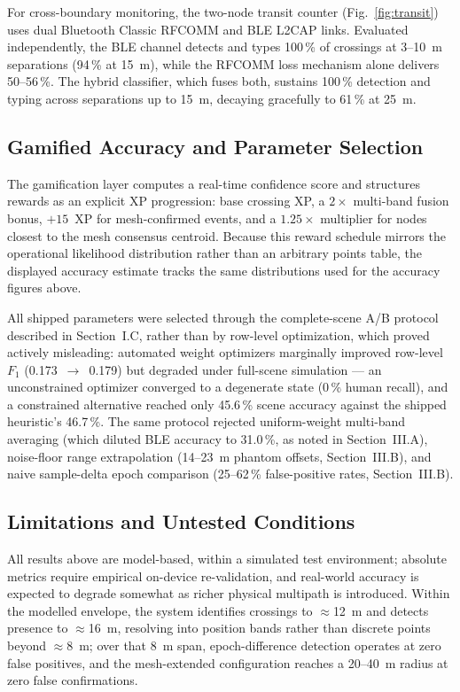 \documentclass[journal,10pt]{IEEEtran}
\begin{document}
For cross-boundary monitoring, the two-node transit counter (Fig.~\ref{fig:transit})
uses dual Bluetooth Classic RFCOMM and BLE L2CAP links. Evaluated
independently, the BLE channel detects and types 100\,\% of crossings at
3--10~m separations (94\,\% at 15~m), while the RFCOMM loss mechanism alone
delivers 50--56\,\%. The hybrid classifier, which fuses both, sustains
100\,\% detection and typing across separations up to 15~m, decaying
gracefully to 61\,\% at 25~m.

\subsection{Gamified Accuracy and Parameter Selection}
The gamification layer computes a real-time confidence score and structures
rewards as an explicit XP progression: base crossing XP, a $2\times$
multi-band fusion bonus, $+15$~XP for mesh-confirmed events, and a
$1.25\times$ multiplier for nodes closest to the mesh consensus centroid.
Because this reward schedule mirrors the operational likelihood
distribution rather than an arbitrary points table, the displayed accuracy
estimate tracks the same distributions used for the accuracy figures above.

All shipped parameters were selected through the complete-scene A/B protocol
described in Section~I.C, rather than by row-level optimization, which
proved actively misleading: automated weight optimizers marginally improved
row-level $F_1$ (0.173~$\to$~0.179) but degraded under full-scene
simulation --- an unconstrained optimizer converged to a degenerate state
(0\,\% human recall), and a constrained alternative reached only 45.6\,\%
scene accuracy against the shipped heuristic's 46.7\,\%. The same protocol
rejected uniform-weight multi-band averaging (which diluted BLE accuracy to
31.0\,\%, as noted in Section~III.A), noise-floor range extrapolation
(14--23~m phantom offsets, Section~III.B), and naive sample-delta epoch
comparison (25--62\,\% false-positive rates, Section~III.B).

\subsection{Limitations and Untested Conditions}
All results above are model-based, within a simulated test environment;
absolute metrics require empirical on-device re-validation, and real-world
accuracy is expected to degrade somewhat as richer physical multipath is
introduced. Within the modelled envelope, the system identifies crossings to
$\approx$12~m and detects presence to $\approx$16~m, resolving into position
bands rather than discrete points beyond $\approx$8~m; over that 8~m span,
epoch-difference detection operates at zero false positives, and the
mesh-extended configuration reaches a 20--40~m radius at zero false
confirmations.
\end{document}
